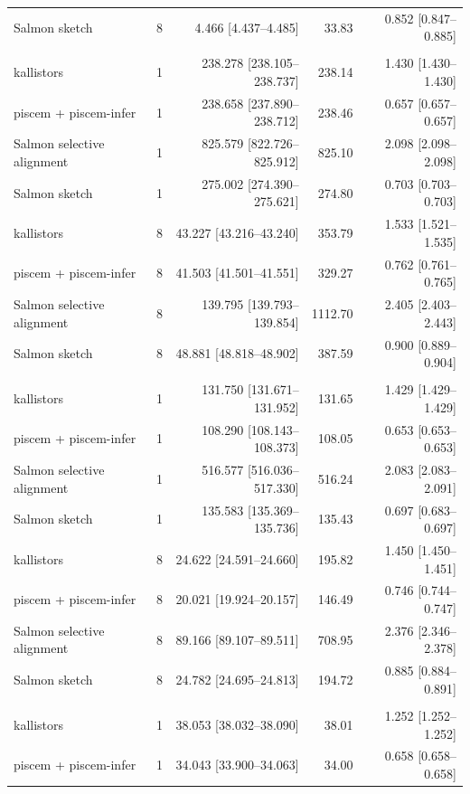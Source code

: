 \begin{longtable}{@{}lrrrr@{}}
Salmon sketch & 8 & 4.466 [4.437--4.485] & 33.83 & 0.852 [0.847--0.885] \\
\addlinespace
\multicolumn{5}{@{}l}{\textit{SRR307903}} \\
kallistors & 1 & 238.278 [238.105--238.737] & 238.14 & 1.430 [1.430--1.430] \\
piscem + piscem-infer & 1 & 238.658 [237.890--238.712] & 238.46 & 0.657 [0.657--0.657] \\
Salmon selective alignment & 1 & 825.579 [822.726--825.912] & 825.10 & 2.098 [2.098--2.098] \\
Salmon sketch & 1 & 275.002 [274.390--275.621] & 274.80 & 0.703 [0.703--0.703] \\
kallistors & 8 & 43.227 [43.216--43.240] & 353.79 & 1.533 [1.521--1.535] \\
piscem + piscem-infer & 8 & 41.503 [41.501--41.551] & 329.27 & 0.762 [0.761--0.765] \\
Salmon selective alignment & 8 & 139.795 [139.793--139.854] & 1112.70 & 2.405 [2.403--2.443] \\
Salmon sketch & 8 & 48.881 [48.818--48.902] & 387.59 & 0.900 [0.889--0.904] \\
\addlinespace
\multicolumn{5}{@{}l}{\textit{SRR307903-se}} \\
kallistors & 1 & 131.750 [131.671--131.952] & 131.65 & 1.429 [1.429--1.429] \\
piscem + piscem-infer & 1 & 108.290 [108.143--108.373] & 108.05 & 0.653 [0.653--0.653] \\
Salmon selective alignment & 1 & 516.577 [516.036--517.330] & 516.24 & 2.083 [2.083--2.091] \\
Salmon sketch & 1 & 135.583 [135.369--135.736] & 135.43 & 0.697 [0.683--0.697] \\
kallistors & 8 & 24.622 [24.591--24.660] & 195.82 & 1.450 [1.450--1.451] \\
piscem + piscem-infer & 8 & 20.021 [19.924--20.157] & 146.49 & 0.746 [0.744--0.747] \\
Salmon selective alignment & 8 & 89.166 [89.107--89.511] & 708.95 & 2.376 [2.346--2.378] \\
Salmon sketch & 8 & 24.782 [24.695--24.813] & 194.72 & 0.885 [0.884--0.891] \\
\addlinespace
\multicolumn{5}{@{}l}{\textit{fragment-truth}} \\
kallistors & 1 & 38.053 [38.032--38.090] & 38.01 & 1.252 [1.252--1.252] \\
piscem + piscem-infer & 1 & 34.043 [33.900--34.063] & 34.00 & 0.658 [0.658--0.658] \\

\end{longtable}
